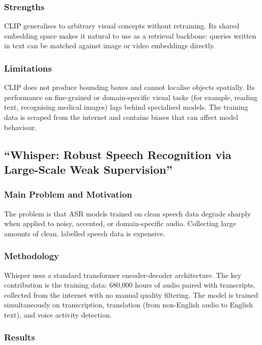 \documentclass[12pt, a4paper]{report}
\begin{document}
\subsubsection{Strengths}

CLIP generalises to arbitrary visual concepts without retraining. Its shared
embedding space makes it natural to use as a retrieval backbone: queries
written in text can be matched against image or video embeddings directly.

\subsubsection{Limitations}

CLIP does not produce bounding boxes and cannot localise objects spatially.
Its performance on fine-grained or domain-specific visual tasks (for example,
reading text, recognising medical images) lags behind specialised models.
The training data is scraped from the internet and contains biases that
can affect model behaviour.

\subsection{``Whisper: Robust Speech Recognition via Large-Scale Weak
Supervision'' \cite{radford2023whisper}}

\subsubsection{Main Problem and Motivation}

The problem is that ASR models trained on clean speech data degrade sharply
when applied to noisy, accented, or domain-specific audio. Collecting
large amounts of clean, labelled speech data is expensive.

\subsubsection{Methodology}

Whisper uses a standard transformer encoder-decoder architecture. The key
contribution is the training data: 680,000 hours of audio paired with
transcripts, collected from the internet with no manual quality filtering.
The model is trained simultaneously on transcription, translation (from
non-English audio to English text), and voice activity detection.

\subsubsection{Results}
\end{document}
